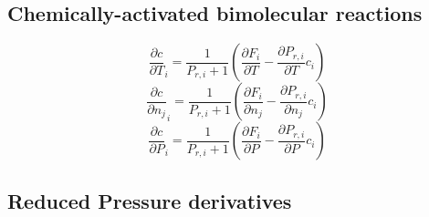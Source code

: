 \documentclass[a4paper,10pt]{article}
\begin{document}
\subsection{Chemically-activated bimolecular reactions}
\begin{dmath} \frac{\partial c }{\partial T }_{i} = \frac{1}{P_{r, i} + 1} \left(\frac{\partial F_{i} }{\partial T } - \frac{\partial P_{r, i} }{\partial T } c_{i}\right)\end{dmath} 
\begin{dmath} \frac{\partial c }{\partial {n_j} }_{i} = \frac{1}{P_{r, i} + 1} \left(\frac{\partial F_{i} }{\partial {n_j} } - \frac{\partial P_{r, i} }{\partial {n_j} } c_{i}\right)\end{dmath} 
\begin{dmath} \frac{\partial c }{\partial P }_{i} = \frac{1}{P_{r, i} + 1} \left(\frac{\partial F_{i} }{\partial P } - \frac{\partial P_{r, i} }{\partial P } c_{i}\right)\end{dmath} 
\subsection{Reduced Pressure derivatives}
\end{document}
